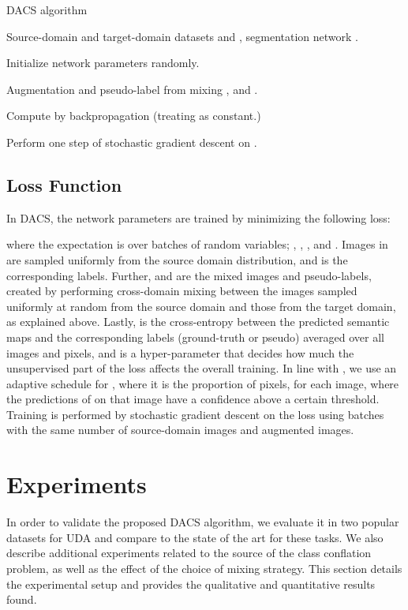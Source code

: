 \documentclass[10pt,twocolumn,letterpaper]{article}
\begin{document}
\begin{algorithm}[t]
\caption{DACS algorithm}
\label{alg:crossmix}
\begin{algorithmic}[1]
\Require Source-domain and target-domain datasets  and , segmentation network . 

\State Initialize network parameters  randomly.

    \State  
    \State  
    \State  
    \State  Augmentation and pseudo-label from mixing ,  and .
    
    \State  {}
    
    \State  {}
    \State Compute  by backpropagation (treating  as constant.)
    
    \State Perform one step of stochastic gradient descent on .

\EndFor
\State \Return 
\end{algorithmic}
\end{algorithm}


\subsection{Loss Function}
\label{sec:loss_and_training}
In DACS, the network parameters  are trained by minimizing the following loss:

where the expectation is over batches of random variables; , , , and . Images in  are sampled uniformly from the source domain distribution, and  is the corresponding labels. Further,  and  are the mixed images and pseudo-labels, created by performing cross-domain mixing between the images sampled uniformly at random from the source domain and those from the target domain, as explained above. Lastly,  is the cross-entropy between the predicted semantic maps and the corresponding labels (ground-truth or pseudo) averaged over all images and pixels, and  is a hyper-parameter that decides how much the unsupervised part of the loss affects the overall training. In line with \cite{French,ClassMix}, we use an adaptive schedule for , where it is the proportion of pixels, for each image, where the predictions of  on that image have a confidence above a certain threshold. Training is performed by stochastic gradient descent on the loss using batches with the same number of source-domain images and augmented images.


\section{Experiments}
\label{sec:results}
In order to validate the proposed DACS algorithm, we evaluate it in two popular datasets for UDA and compare to the state of the art for these tasks. We also describe additional experiments related to the source of the class conflation problem, as well as the effect of the choice of mixing strategy. This section details the experimental setup and provides the qualitative and quantitative results found.
\end{document}
